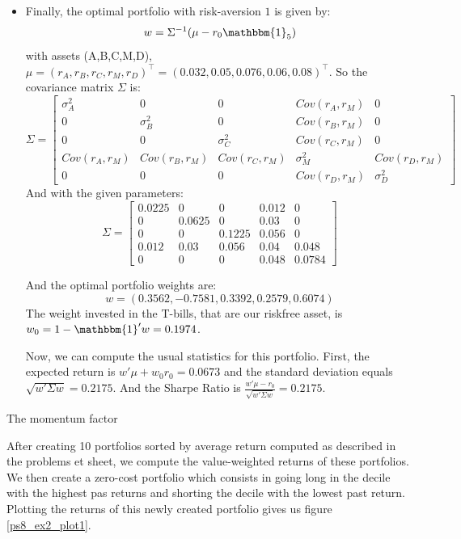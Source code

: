 \documentclass[10pt]{article}
\newenvironment{exercise}[2][Exercise]{\begin{trivlist}
  \item[\hskip \labelsep {\bfseries #1}\hskip \labelsep {\bfseries #2.}]}{\end{trivlist}}
\begin{document}
\begin{itemize}
  In addition, the Information Ratio is the ratio $IR = \frac{\alpha_D}{\sigma_D} =\frac{0.012}{0.08}= 0.15$
  \item[(d)] Finally, the optimal portfolio with risk-aversion $1$ is given by:
  $$ w = \Sigma^{-1}(\mu-r_0\mathbbm{1}_5)$$ with assets (A,B,C,M,D), $\mu = (r_A,r_B,r_C,r_M,r_D)^\top = (0.032,0.05,0.076,0.06,0.08)^\top$. So the covariance matrix $\Sigma$ is: 
  $$ \Sigma = \left[\begin{array}{ccccc}
    \sigma_A^2& 0 &0 &Cov(r_A,r_M)& 0\\
    0&\sigma_B^2 & 0 & Cov(r_B,r_M)&0 \\
    0&0&\sigma_C^2&Cov(r_C,r_M)&0\\
    Cov(r_A,r_M)&Cov(r_B,r_M)&Cov(r_C,r_M)&\sigma_M^2&Cov(r_D,r_M)\\
    0&0&0&Cov(r_D,r_M)&\sigma_D^2
  \end{array}\right]$$ 
  And with the given parameters: 
  $$ \Sigma = \left[\begin{array}{ccccc}
    0.0225 & 0 & 0 & 0.012 &0 \\
    0 & 0.0625 & 0 & 0.03 & 0 \\
    0 & 0 & 0.1225 & 0.056 & 0 \\
    0.012 & 0.03 & 0.056 & 0.04 & 0.048 \\
    0 & 0 & 0 & 0.048 & 0.0784 
  \end{array}\right]$$

  And the optimal portfolio weights are: 
 $$ w = (0.3562, -0.7581, 0.3392, 0.2579, 0.6074)$$
 The weight invested in the T-bills, that are our riskfree asset, is $w_0 = 1- \mathbbm{1}'w = 0.1974$.

 Now, we can compute the usual statistics for this portfolio. First, the expected return is $w'\mu + w_0r_0 = 0.0673$ and the standard deviation equals $\sqrt{w'\Sigma w} = 0.2175$. And the Sharpe Ratio is $ \frac{w'\mu - r_0}{\sqrt{w'\Sigma w}} = 0.2175$.
\end{itemize}
  
\newpage

\begin{exercise}{2}{The momentum factor}
\end{exercise}

After creating 10 portfolios sorted by average return computed as described in the problems et sheet, we compute the value-weighted  returns  of these portfolios. We then create a zero-cost portfolio which consists  in going long in the decile with the highest pas returns and shorting the decile with the lowest past return. Plotting the returns of this newly created portfolio gives us figure \ref{ps8_ex2_plot1}.
\end{document}
